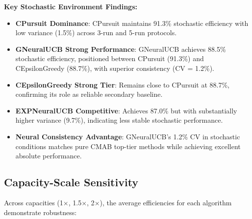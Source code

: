 \documentclass[12pt,a4paper]{article}
\newcommand{\performance}[1]{\textcolor{performancecolor}{\textbf{#1}}}
\newcommand{\stochastic}[1]{\textcolor{stochasticcolor}{\textbf{#1}}}
\newcommand{\legacy}[1]{\textcolor{legacycolor}{\textbf{#1}}}
\newcommand{\neural}[1]{\textcolor{neuralcolor}{\textbf{#1}}}
\begin{document}
\begin{tcolorbox}[colback=stochasticcolor!10,colframe=stochasticcolor,title=\textbf{Stochastic Environment Deep Analysis (1$\times$–2$\times$ Capacities, T/Tb Combined, 3-run/5-run)}]
\textbf{Key Stochastic Environment Findings:}
\begin{itemize}
\item \stochastic{CPursuit Dominance}: CPursuit maintains 91.3\% stochastic efficiency with low variance (1.5\%) across 3-run and 5-run protocols.
\item \neural{GNeuralUCB Strong Performance}: GNeuralUCB achieves 88.5\% stochastic efficiency, positioned between CPursuit (91.3\%) and CEpsilonGreedy (88.7\%), with superior consistency (CV = 1.2\%).
\item \performance{CEpsilonGreedy Strong Tier}: Remains close to CPursuit at 88.7\%, confirming its role as reliable secondary baseline.
\item \legacy{EXPNeuralUCB Competitive}: Achieves 87.0\% but with substantially higher variance (9.7\%), indicating less stable stochastic performance.
\item \neural{Neural Consistency Advantage}: GNeuralUCB's 1.2\% CV in stochastic conditions matches pure CMAB top-tier methods while achieving excellent absolute performance.
\end{itemize}

\end{tcolorbox}

\subsection{Capacity-Scale Sensitivity}

Across capacities (1$\times$, 1.5$\times$, 2$\times$), the average efficiencies for each algorithm demonstrate robustness:
\end{document}
